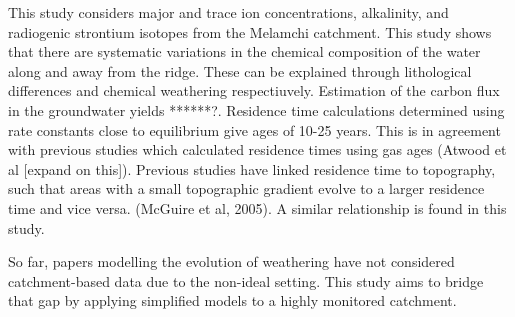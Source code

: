  
\bsk

This study considers major and trace ion concentrations, alkalinity, and radiogenic strontium isotopes from the Melamchi catchment. This study shows that there are systematic variations in the chemical composition of the water along and away from the ridge. These can be explained through lithological differences and chemical weathering respectiuvely. Estimation of the carbon flux in the groundwater yields ******?. Residence time calculations determined using rate constants close to equilibrium give ages of 10-25 years. This is in agreement with previous studies which calculated residence times using gas ages (Atwood et al [expand on this]). Previous studies have linked residence time to topography, such that areas with a small topographic gradient evolve to a larger residence time and vice versa. (McGuire et al, 2005). A similar relationship is found in this study.



So far, papers modelling the evolution of weathering have not considered catchment-based data due to the non-ideal setting. This study aims to bridge that gap by applying simplified models to a highly monitored catchment.














